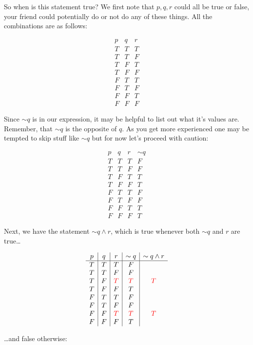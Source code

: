 \documentclass[10pt]{article}
\theoremstyle{definition}
\begin{document}
So when is this statement true?  We first note that $p,q,r$ could all be true or false, your friend could potentially do or not do any of these things.  All the combinations are as follows:

 $$\begin{array}{c|c|c}
p&q&r\\
\hline
T & T&T\\
T&T&F\\
T&F&T\\
T&F&F\\
F & T&T\\
F&T&F\\
F&F&T\\
F&F&F
\end{array}$$

Since $\sim q$ is in our expression, it may be helpful to list out what it's values are.  Remember, that $\sim q$ is the opposite of $q$.  As you get more experienced one may be tempted to skip stuff like $\sim q$ but for now let's proceed with caution:

 $$\begin{array}{c|c|c|c}
p&q&r&\sim q\\
\hline
T & T&T&F\\
T&T&F&F\\
T&F&T&T\\
T&F&F&T\\
F & T&T&F\\
F&T&F&F\\
F&F&T&T\\
F&F&F&T
\end{array}$$

Next, we have the statement $\sim q \wedge r$, which is true whenever both $\sim q$ and $r$ are true\ldots

 $$\begin{array}{c|c|c|c|c}
p&q&r&\sim q & \sim q \wedge r\\
\hline
T & T&T&F & \\
T&T&F&F& \\
T&F&\textcolor{red}{T}&\textcolor{red}{T}&\textcolor{red}{T}\\
T&F&F&T\\
F & T&T&F\\
F&T&F&F\\
F&F&\textcolor{red}{T}&\textcolor{red}{T}&\textcolor{red}{T}\\
F&F&F&T
\end{array}$$

\ldots and false otherwise:
\end{document}
